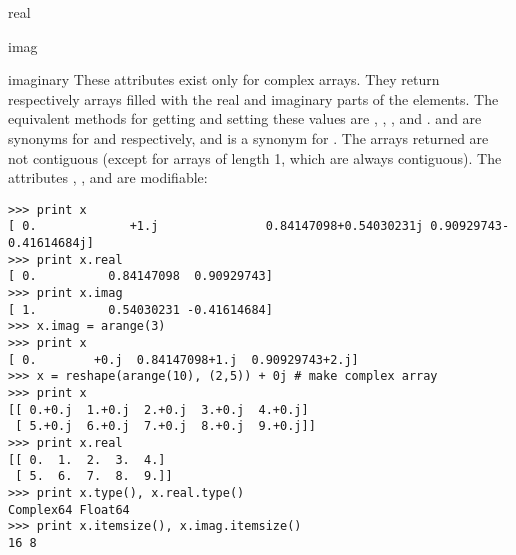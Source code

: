 \begin{memberdesc}[numarray]{real}
\end{memberdesc}
\begin{memberdesc}[numarray]{imag}
\end{memberdesc}
\begin{memberdesc}[numarray]{imaginary}
   These attributes exist only for complex arrays. They return respectively
   arrays filled with the real and imaginary parts of the elements. The
   equivalent methods for getting and setting these values are
   , , , and .
    and  are synonyms for
    and  respectively, and  is a
   synonym for .  The arrays returned are not contiguous
   (except for arrays of length 1, which are always contiguous).
   The attributes , , and  are 
   modifiable:
\begin{verbatim}
>>> print x
[ 0.             +1.j               0.84147098+0.54030231j 0.90929743-0.41614684j]
>>> print x.real
[ 0.          0.84147098  0.90929743]
>>> print x.imag
[ 1.          0.54030231 -0.41614684]
>>> x.imag = arange(3)
>>> print x
[ 0.        +0.j  0.84147098+1.j  0.90929743+2.j]
>>> x = reshape(arange(10), (2,5)) + 0j # make complex array
>>> print x
[[ 0.+0.j  1.+0.j  2.+0.j  3.+0.j  4.+0.j]
 [ 5.+0.j  6.+0.j  7.+0.j  8.+0.j  9.+0.j]]
>>> print x.real
[[ 0.  1.  2.  3.  4.]
 [ 5.  6.  7.  8.  9.]]
>>> print x.type(), x.real.type()
Complex64 Float64
>>> print x.itemsize(), x.imag.itemsize()
16 8
\end{verbatim}
\end{memberdesc}


